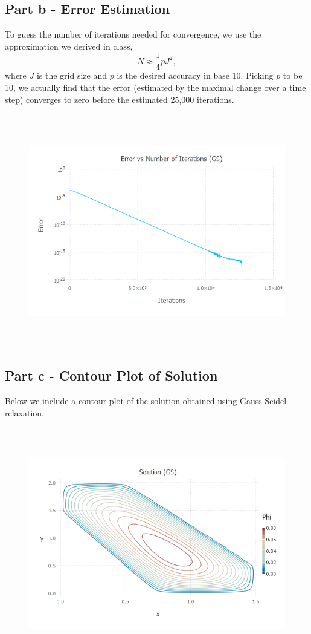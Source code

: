 \documentclass{article}
\begin{document}
\subsection{Part b - Error Estimation}
To guess the number of iterations needed for convergence, we use the approximation we derived in class,
$$N \approx \frac{1}{4}pJ^2,$$
where $J$ is the grid size and $p$ is the desired accuracy in base 10. Picking $p$ to be 10, we actually find that the error (estimated by the maximal change over a time step) converges to zero before the estimated 25,000 iterations.
\begin{figure}[H]
	\includegraphics[width=6in,height=4in]{"q2_gs_error"}
\end{figure}

\subsection{Part c - Contour Plot of Solution}
Below we include a contour plot of the solution obtained using Gauss-Seidel relaxation.
\begin{figure}[H]
	\includegraphics[width=6in,height=4in]{"q2_gs_solution"}
\end{figure}
\end{document}
